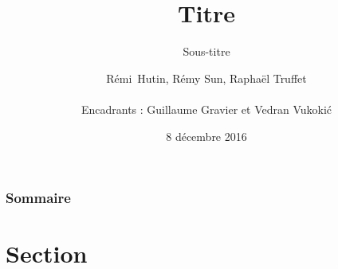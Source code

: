 \documentclass[11pt,english]{beamer}
\title{Titre}
\subtitle{Sous-titre}
\author{Rémi~Hutin, Rémy Sun, Raphaël Truffet\\ \\Encadrants : Guillaume Gravier et Vedran Vukoki\'c}
\institute{ENS Rennes, IRISA}
\date{8 décembre 2016}
\begin{document}
\begin{frame}
    \titlepage
\end{frame}

\begin{frame}
    \frametitle{Sommaire}
    \tableofcontents[hideallsubsections]
\end{frame}


\section{Section}
\end{document}
